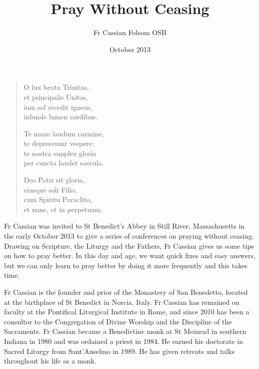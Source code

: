 \documentclass[10pt,a5paper]{book}
\title{Pray Without Ceasing}
\date{October 2013}
\author{Fr Cassian Folsom OSB}
\newenvironment{poem}
  {\begin{center}\begin{itshape}\begin{verse}
  }
  {\end{verse}\end{itshape}\end{center}
  }
\begin{document}
\maketitle

\begin{poem}
O lux beata Trinitas, \\
et principalis Unitas, \\
iam sol recedit igneus, \\
infunde lumen cordibus.

Te mane laudum carmine, \\
te deprecemur vespere: \\
te nostra supplex gloria \\
per cuncta laudet saecula.

Deo Patri sit gloria, \\
eiusque soli Filio, \\
cum Spiritu Paraclito, \\
et nunc, et in perpetuum.
\end{poem}

Fr Cassian was invited to St Benedict's Abbey in Still River, Massachusetts in the early October 2013 to give a series of conferences on praying without ceasing. Drawing on Scripture, the Liturgy and the Fathers, Fr Cassian gives us some tips on how to pray better. In this day and age, we want quick fixes and easy answers, but we can only learn to pray better by doing it more frequently and this takes time.

Fr Cassian is the founder and prior of the Monastery of San Benedetto, located at the birthplace of St Benedict in Norcia, Italy. Fr Cassian has remained on faculty at the Pontifical Liturgical Institute in Rome, and since 2010 has been a consultor to the Congregation of Divine Worship and the Discipline of the Sacraments. Fr Cassian became a Benedictine monk at St Meinrad in southern Indiana in 1980 and was ordained a priest in 1984. He earned his doctorate in Sacred Liturgy from Sant'Anselmo in 1989. He has given retreats and talks throughout his life as a monk.


\end{document}
